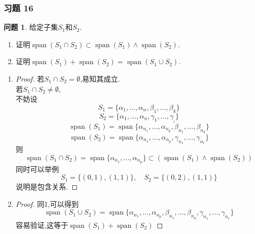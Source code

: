 \documentclass[11pt]{ctexart}
\theoremstyle{definition}
\newtheorem{qqq}{问题}[section]
\numberwithin{equation}{section}
\newcommand{\sspan}{\operatorname{span}}%
\begin{document}
\subsubsection{习题 16}
\begin{qqq}
    给定子集$S_1$和$S_2$.
    \begin{enumerate}
        \item 证明$\sspan (S_1\cap S_2)\subset \sspan(S_1)\wedge \sspan(S_2).$
        \item 证明$\sspan(S_1)+\sspan(S_2)=\sspan(S_1\cup S_2).$
    \end{enumerate}
\end{qqq}
\begin{aaa}
    \begin{enumerate}
        \item \begin{proof}
                若$S_1\cap S_2=\emptyset$,易知其成立.\\
                若$S_1\cap S_2\neq \emptyset $,\\
                不妨设\[S_1=\{\alpha_1,\ldots,\alpha_n,\beta_1,\ldots,\beta_k\}\]
                    \[S_2=\{\alpha_1,\ldots,\alpha_n,\gamma_1,\ldots,\gamma_{_l}\}\]
                    \[\sspan(S_1)=\sspan\{\alpha_{n_1},\ldots,\alpha_{n_{p}},\beta_{n_1},\ldots,\beta_{n_q}\}\]
                    \[\sspan(S_2)=\sspan\{\alpha_{n_1},\ldots,\alpha_{n_{p}},\gamma_{n_1},\ldots,\gamma_{n_r}\}\]
                    则
                    \[\sspan(S_1\cap S_2)=\sspan\{{\alpha_{n_1}},\ldots,\alpha_{n_p}\}\subset (\sspan(S_1)\wedge \sspan(S_2))\]
                    同时可以举例\[S_1=\{(0,1),(1,1)\},\quad S_2=\{(0,2),(1,1)\}\]说明是包含关系.

                \end{proof}


        \item \begin{proof}
                同1,可以得到\[\sspan(S_1\cup S_2)=\sspan\{\alpha_{n_1},\ldots,\alpha_{n_{p}},\beta_{n_1},\ldots,\beta_{n_q},\gamma_{n_1},\ldots,\gamma_{n_r}\}\]
                容易验证,这等于$\sspan(S_1)+\sspan(S_2)$
                \end{proof}
    \end{enumerate}
\end{aaa}
\end{document}
